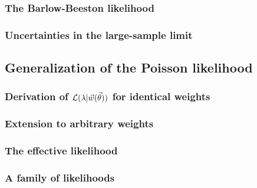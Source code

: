 \subsubsection{The Barlow-Beeston likelihood}
\begingroup
\graphicspath{{results/mcllh_paper/}}

\endgroup

\subsubsection{Uncertainties in the large-sample limit}
\begingroup
\graphicspath{{results/mcllh_paper/}}

\endgroup

\subsection{Generalization of the Poisson likelihood\label{sec:generalization_poisson}}
\begingroup
\graphicspath{{results/mcllh_paper/}}

\endgroup

\subsubsection{Derivation of $\mathcal{L} (\lambda|\vec{w}(\vec{\theta}))$ for identical weights\label{sec:constructing}}
\begingroup
\graphicspath{{results/mcllh_paper/}}

\endgroup

\subsubsection{Extension to arbitrary weights\label{sec:extending}}
\begingroup
\graphicspath{{results/mcllh_paper/}}

\endgroup

\subsubsection{The effective likelihood\label{sec:effective}}
\begingroup
\graphicspath{{results/mcllh_paper/}}

\endgroup

\subsubsection{A family of likelihoods\label{sec:priors}}
\begingroup
\graphicspath{{results/mcllh_paper/}}

\endgroup

